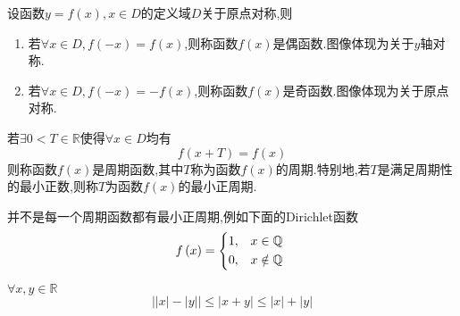 \begin{formal}
    \begin{definition}[奇偶性的定义]\label{def:奇偶性的定义}
        设函数$y=f\left(x\right),x\in D$的定义域$D$关于原点对称,则\begin{enumerate}[label={\textup{(\arabic*)}}]
            \item 若$\forall x\in D,f\left(-x\right)=f\left(x\right)$,则称函数$f\left(x\right)$是偶函数.图像体现为关于$y$轴对称.
            \item 若$\forall x\in D,f\left(-x\right)=-f\left(x\right)$,则称函数$f\left(x\right)$是奇函数.图像体现为关于原点对称.
        \end{enumerate}
    \end{definition}
\end{formal}
\begin{formal}
    \begin{definition}[周期性的定义]\label{def:周期性的定义}
        若$\exists 0<T\in\mathbb{R}$使得$\forall x\in D$均有\[
        f\left(x+T\right)=f\left(x\right)
        \]则称函数$f\left(x\right)$是周期函数,其中$T$称为函数$f\left(x\right)$的周期.特别地,若$T$是满足周期性的最小正数,则称$T$为函数$f\left(x\right)$的最小正周期.
    \end{definition}
\end{formal}
\begin{brown}
    \begin{example}
        并不是每一个周期函数都有最小正周期,例如下面的\textup{Dirichlet}函数\[
        f\left(x\right)=\begin{cases*}
            1,&$x\in\mathbb{Q}$\\
            0,&$x\notin\mathbb{Q}$
        \end{cases*}
        \]
    \end{example}
\end{brown}
\begin{formal}
    \begin{theorem}[三角不等式]\label{thm:三角不等式}
        $\forall x,y\in\mathbb{R}$
        \[
        \left|
            \left|x\right|-\left|y\right|
        \right|\leqslant \left|
            x+y
        \right|\leqslant\left|x\right|+\left|y\right|
        \]
    \end{theorem}
\end{formal}
